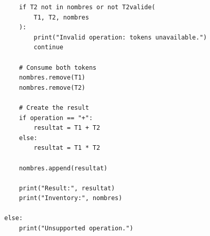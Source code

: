 \documentclass[12pt,a4paper]{article}
\begin{document}
\begin{lstlisting}
            if T2 not in nombres or not T2valide(
                T1, T2, nombres
            ):
                print("Invalid operation: tokens unavailable.")
                continue

            # Consume both tokens
            nombres.remove(T1)
            nombres.remove(T2)

            # Create the result
            if operation == "+":
                resultat = T1 + T2
            else:
                resultat = T1 * T2

            nombres.append(resultat)

            print("Result:", resultat)
            print("Inventory:", nombres)

        else:
            print("Unsupported operation.")
\end{lstlisting}
\end{document}
